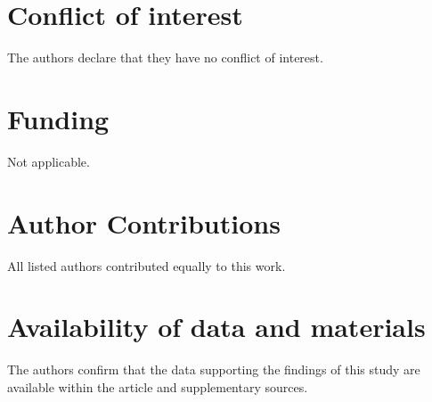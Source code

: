 \documentclass[a4paper,11pt]{article}
\begin{document}
%

\section*{Conflict of interest} The authors declare that they have no conflict of interest.


\section*{Funding} Not applicable.


\section*{Author Contributions} All listed authors contributed equally to this work.


\section*{Availability of data and materials} The authors confirm that the data supporting the findings of this study
are available within the article and supplementary sources.



 




\end{document}
